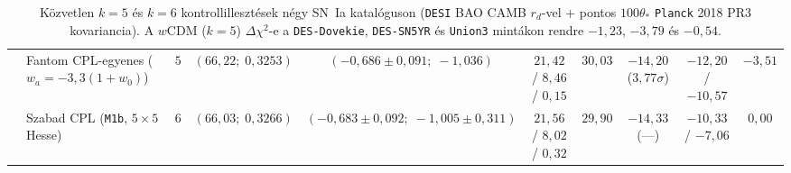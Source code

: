 \documentclass[11pt,a4paper]{article}
\begin{document}
\begin{table}[ht!]
{\begin{tabular}{llcccccccc}
 & Fantom CPL-egyenes ($w_a=-3{,}3(1+w_0)$) & $5$ & $(66{,}22;\;0{,}3253)$ & $(-0{,}686 \pm 0{,}091;\;-1{,}036)$ & $21{,}42$ / $8{,}46$ / $0{,}15$ & $30{,}03$ & $-14{,}20$ ($3{,}77\sigma$) & $-12{,}20$ / $-10{,}57$ & $-3{,}51$ \\
 & Szabad CPL (\texttt{M1b}, $5\times 5$ Hesse) & $6$ & $(66{,}03;\;0{,}3266)$ & $(-0{,}683\pm 0{,}092;\;-1{,}005\pm 0{,}311)$ & $21{,}56$ / $8{,}02$ / $0{,}32$ & $29{,}90$ & $-14{,}33$ (---) & $-10{,}33$ / $-7{,}06$ & $0{,}00$ \\
\bottomrule
\end{tabular}%
}
\caption{K\"ozvetlen $k=5$ \'es $k=6$ kontrollilleszt\'esek n\'egy SN~Ia katal\'oguson (\texttt{DESI} BAO CAMB $r_d$-vel + pontos $100\theta_*$ \texttt{Planck} 2018 PR3 kovariancia). A $w$CDM ($k=5$) $\Delta\chi^2$-e a \texttt{DES-Dovekie}, \texttt{DES-SN5YR} \'es \texttt{Union3} mint\'akon rendre $-1{,}23$, $-3{,}79$ \'es $-0{,}54$.}
\label{tab:multi-sn}
\end{table}

\begin{table}[ht!]
\centering
\scriptsize
\setlength{\tabcolsep}{3.0pt}
\renewcommand{\arraystretch}{1.11}
\caption{Balra: Chen--Huang--Wang \cite{ChenHuangWang2019} $(R, \ell_A, \omega_b)$ prior (\texttt{Union3}: $-12{,}09$) \'es Aubourg et al.\ \cite{Aubourg2015BAO} $r_d = 146{,}90\;\mathrm{Mpc}$ keresztellen\H{o}rz\'esek ($\pm 0{,}15\%$ $r_d$-eltol\'as: $-11{,}01 \dots -8{,}66$). Jobbra: teljes $f_{v,0} \in [0{,}60; 0{,}84]$ szken.}
\label{tab:chw-fv0}
\end{table}
\end{document}
